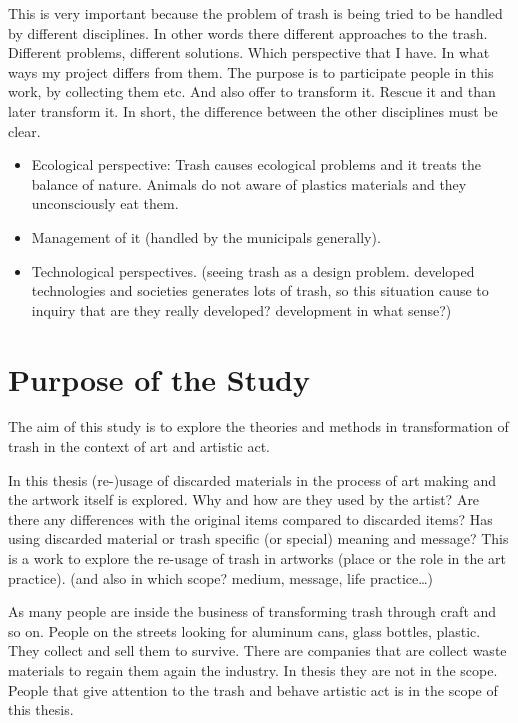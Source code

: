 This is very important because the problem of trash is being tried to be handled by different disciplines. In other words there different approaches to the trash. Different problems, different solutions. Which perspective that I have. In what ways my project differs from them. The purpose is to participate people in this work, by collecting them etc. And also offer to transform it. Rescue it and than later transform it. In short, the difference between the other disciplines must be clear. 
\begin{itemize}
\item Ecological perspective: Trash causes ecological problems and it treats the balance of nature. Animals do not aware of plastics materials and they unconsciously eat them.
\item Management of it (handled by the municipals generally).
\item Technological perspectives. (seeing trash as a design problem. developed technologies and societies generates lots of trash, so this situation cause to inquiry that are they really developed? development in what sense?)
\end{itemize}


\section{Purpose of the Study}

The aim of this study is to explore the theories and methods in transformation of trash in the context of art and artistic act.

In this thesis (re-)usage of discarded materials in the process of art making and the artwork itself is explored. Why and how are they used by the artist? Are there any differences with the original items compared to discarded items? Has using discarded material or trash specific (or special) meaning and message? This is a work to explore the re-usage of trash in artworks (place or the role in the art practice). (and also in which scope? medium, message, life practice\ldots) 

As many people are inside the business of transforming trash through craft and so on. People on the streets looking for aluminum cans, glass bottles, plastic. They collect and sell them to survive. There are companies that are collect waste materials to regain them again the industry. In thesis they are not in the scope. People that give attention to the trash and behave artistic act is in the scope of this thesis.

